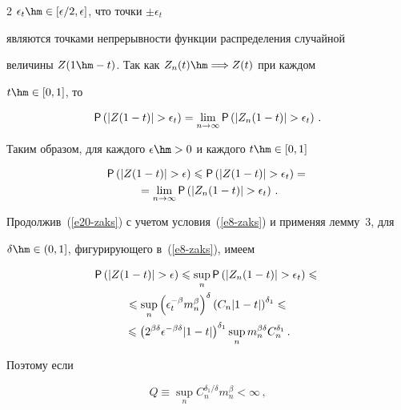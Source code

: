\begin{multicols}{2}
$\epsilon_t\hm\in[\epsilon/2,\epsilon]$, что точки $\pm\epsilon_t$

являются точками непрерывности функции распределения случайной

величины $Z(1\hm-t)$. Так как $Z_n(t)\hm\Longrightarrow Z(t)$ при каж\-дом

$t\hm\in[0,1]$, то

$$

{\sf P}\left(|Z(1-t)|>\epsilon_t\right)=\lim_{n\to\infty}{\sf P}\left(|Z_n(1-t)|>\epsilon_t\right)\,.

$$

Таким образом, для каждого $\epsilon\hm>0$ и каждого $t\hm\in[0,1]$

\begin{multline}

{\sf P}\left(|Z(1-t)|>\epsilon\right)\leqslant{\sf P}\left(|Z(1-t)|>\epsilon_t\right)={}\\

{}=\lim\limits_{n\to\infty}{\sf P}

\left(|Z_n(1-t)|>\epsilon_t\right)\,.\label{e20-zaks}

\end{multline}

Продолжив~(\ref{e20-zaks}) с учетом условия~(\ref{e8-zaks}) и применяя лемму~3, для

$\delta\hm\in(0,1]$, фигурирующего в~(\ref{e8-zaks}), имеем

\begin{multline}

{\sf P}\left(|Z(1-t)|>\epsilon\right)\leqslant\sup\limits_n{\sf P}\left(|Z_n(1-t)|>\epsilon_t\right)\leqslant{}\\

{}\leqslant\sup\limits_n\left(\epsilon_t^{-\beta}m_n^{\beta}\right)^{\delta}\left(C_n|1-t|\right)^{\delta_1}\leqslant{}\\

{}\leqslant

\left(2^{\beta\delta}\epsilon^{-\beta\delta}|1-t|\right)^{\delta_1}\sup\limits_nm_n^{\beta\delta}C_n^{\delta_1}\,.

\label{e21-zaks}

\end{multline}

Поэтому если

\begin{equation}

Q\equiv\sup\limits_nC_n^{\delta_1/\delta}m_n^{\beta}<\infty\,,\label{e22-zaks}


\end{equation}
\end{multicols}
